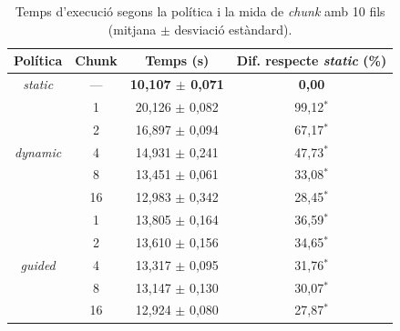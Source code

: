 \begin{table}[H]
\centering
\begin{tabular}{|c|c|c|c|}
\hline
\textbf{Política} & \textbf{Chunk} & \textbf{Temps (s)} & \textbf{Dif. respecte \textit{static} (\%)} \\ \hline
\multirow{1}{*}{\textit{static}} & --- & \textbf{10,107 $\pm$ 0,071} & \textbf{0,00} \\ \hline
\multirow{5}{*}{\textit{dynamic}} & 1 & 20,126 $\pm$ 0,082 & 99,12$^{*}$ \\ \cline{2-4}
 & 2 & 16,897 $\pm$ 0,094 & 67,17$^{*}$ \\ \cline{2-4}
 & 4 & 14,931 $\pm$ 0,241 & 47,73$^{*}$ \\ \cline{2-4}
 & 8 & 13,451 $\pm$ 0,061 & 33,08$^{*}$ \\ \cline{2-4}
 & 16 & 12,983 $\pm$ 0,342 & 28,45$^{*}$ \\ \hline
\multirow{5}{*}{\textit{guided}} & 1 & 13,805 $\pm$ 0,164 & 36,59$^{*}$ \\ \cline{2-4}
 & 2 & 13,610 $\pm$ 0,156 & 34,65$^{*}$ \\ \cline{2-4}
 & 4 & 13,317 $\pm$ 0,095 & 31,76$^{*}$ \\ \cline{2-4}
 & 8 & 13,147 $\pm$ 0,130 & 30,07$^{*}$ \\ \cline{2-4}
 & 16 & 12,924 $\pm$ 0,080 & 27,87$^{*}$ \\ \hline
\end{tabular}
\par{}
\caption{Temps d'execució segons la política i la mida de \textit{chunk} amb 10 fils (mitjana $\pm$ desviació estàndard).}
\label{tab:politiques}
\end{table}

